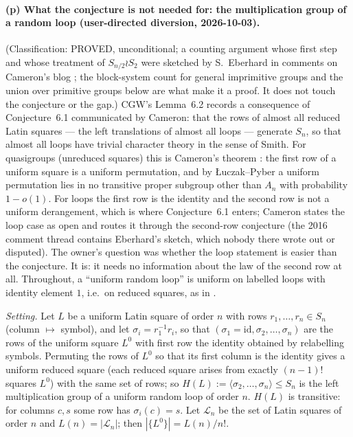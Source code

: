 \paragraph{(p) What the conjecture is not needed for: the multiplication
group of a random loop (user-directed diversion, 2026-10-03).}
(Classification: PROVED, unconditional; a counting argument whose
first step and whose treatment of $S_{n/2}\wr S_2$ were sketched by
S.~Eberhard in comments on Cameron's blog \cite{Cam15}; the block-system
count for general imprimitive groups and the union over primitive
groups below are what make it a proof.  It does not touch the
conjecture or the gap.)  CGW's Lemma~6.2 records a consequence of
Conjecture~6.1 communicated by Cameron: that the rows of almost all
reduced Latin squares --- the left translations of almost all loops ---
generate $S_n$, so that almost all loops have trivial character theory
in the sense of Smith.  For quasigroups (unreduced squares) this is
Cameron's theorem \cite{Cam92}: the first row of a uniform square is a
uniform permutation, and by {\L}uczak--Pyber \cite{LP93} a uniform
permutation lies in no transitive proper subgroup other than $A_n$ with
probability $1-o(1)$.  For loops the first row is the identity and the
second row is not a uniform derangement, which is where
Conjecture~6.1 enters; Cameron \cite{Cam15} states the loop case as
open and routes it through the second-row conjecture (the 2016
comment thread contains Eberhard's sketch, which nobody there wrote
out or disputed).  The owner's question was whether the loop
statement is easier than the conjecture.  It is: it needs no
information about the law of the second row at all.  Throughout, a
``uniform random loop'' is uniform on labelled loops with identity
element $1$, i.e.\ on reduced squares, as in \cite{CGW08}.

\emph{Setting.}  Let $L$ be a uniform Latin square of order $n$ with rows
$r_1,\dots,r_n\in S_n$ (column $\mapsto$ symbol), and let
$\sigma_i=r_1^{-1}r_i$, so that $(\sigma_1=\mathrm{id},\sigma_2,\dots,\sigma_n)$
are the rows of the uniform square $L^0$ with first row the identity
obtained by relabelling symbols.  Permuting the rows of $L^0$ so that
its first column is the identity gives a uniform reduced square (each
reduced square arises from exactly $(n-1)!$ squares $L^0$) with the
same set of rows; so $H(L):=\langle\sigma_2,\dots,\sigma_n\rangle\le S_n$
is the left multiplication group of a uniform random loop of order
$n$.  $H(L)$ is transitive: for columns $c,s$ some row has
$\sigma_i(c)=s$.  Let $\mathcal L_n$ be the set of Latin squares of
order $n$ and $L(n)=|\mathcal L_n|$; then $|\{L^0\}|=L(n)/n!$.

